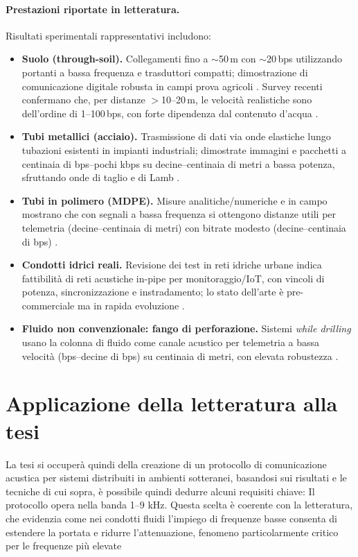 \paragraph{Prestazioni riportate in letteratura.}
Risultati sperimentali rappresentativi includono:
\begin{itemize}
    \item \textbf{Suolo (through-soil).} Collegamenti fino a $\sim$50\,m con $\sim$20\,bps utilizzando portanti a bassa frequenza e trasduttori compatti; dimostrazione di comunicazione digitale robusta in campi prova agricoli \cite{yang2020soil}. Survey recenti confermano che, per distanze $>$10–20\,m, le velocità realistiche sono dell’ordine di 1–100\,bps, con forte dipendenza dal contenuto d’acqua \cite{raza2020wuc,acm2023wusn}.
    \item \textbf{Tubi metallici (acciaio).} Trasmissione di dati via onde elastiche lungo tubazioni esistenti in impianti industriali; dimostrate immagini e pacchetti a centinaia di bps–pochi kbps su decine–centinaia di metri a bassa potenza, sfruttando onde di taglio e di Lamb \cite{heifetz2017pipes,heifetz2020shear}.
    \item \textbf{Tubi in polimero (MDPE).} Misure analitiche/numeriche e in campo mostrano che con segnali a bassa frequenza si ottengono distanze utili per telemetria (decine–centinaia di metri) con bitrate modesto (decine–centinaia di bps) \cite{farai2023mdpe,farai2021phd}.
    \item \textbf{Condotti idrici reali.} Revisione dei test in reti idriche urbane indica fattibilità di reti acustiche in-pipe per monitoraggio/IoT, con vincoli di potenza, sincronizzazione e instradamento; lo stato dell’arte è pre-commerciale ma in rapida evoluzione \cite{fishta2023inpipe}.
    \item \textbf{Fluido non convenzionale: fango di perforazione.} Sistemi \emph{while drilling} usano la colonna di fluido come canale acustico per telemetria a bassa velocità (bps–decine di bps) su centinaia di metri, con elevata robustezza \cite{zheng2023mud}.
\end{itemize}

\section{Applicazione della letteratura alla tesi}
La tesi si occuperà quindi della creazione di un protocollo di comunicazione acustica per sistemi distribuiti in ambienti sotteranei, 
basandosi sui risultati e le tecniche di cui sopra, è possibile quindi dedurre alcuni requisiti chiave:
Il protocollo opera nella banda 1–9 kHz. Questa scelta è coerente con la letteratura, che evidenzia come nei condotti fluidi l’impiego di frequenze basse consenta di estendere la portata e ridurre l’attenuazione, fenomeno particolarmente critico per le frequenze più elevate \cite{fishta2023inpipe}
